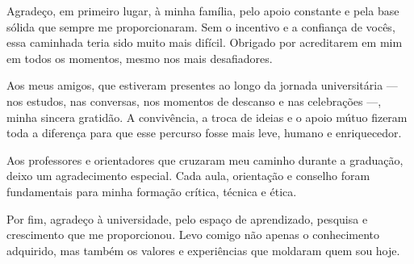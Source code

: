 \documentclass[	12pt, Times, openright, oneside, a4paper, english, brazil]{abntex2}
\begin{document}
      
  


\begin{agradecimentos}
Agradeço, em primeiro lugar, à minha família, pelo apoio constante e pela base sólida que sempre me proporcionaram. Sem o incentivo e a confiança de vocês, essa caminhada teria sido muito mais difícil. Obrigado por acreditarem em mim em todos os momentos, mesmo nos mais desafiadores.

Aos meus amigos, que estiveram presentes ao longo da jornada universitária — nos estudos, nas conversas, nos momentos de descanso e nas celebrações —, minha sincera gratidão. A convivência, a troca de ideias e o apoio mútuo fizeram toda a diferença para que esse percurso fosse mais leve, humano e enriquecedor.

Aos professores e orientadores que cruzaram meu caminho durante a graduação, deixo um agradecimento especial. Cada aula, orientação e conselho foram fundamentais para minha formação crítica, técnica e ética. 

Por fim, agradeço à universidade, pelo espaço de aprendizado, pesquisa e crescimento que me proporcionou. Levo comigo não apenas o conhecimento adquirido, mas também os valores e experiências que moldaram quem sou hoje.

\end{agradecimentos}
\end{document}
